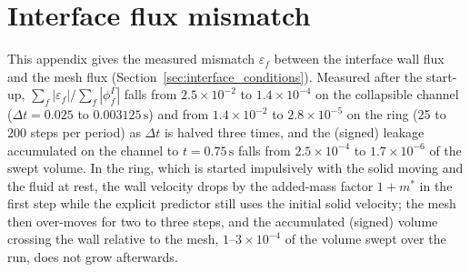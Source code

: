 \section{Interface flux mismatch}\label{app:interface_flux}

This appendix gives the measured mismatch $\varepsilon_f$ between the interface wall flux and the mesh flux (Section~\ref{sec:interface_conditions}).
Measured after the start-up, $\sum_f|\varepsilon_f|/\sum_f|\phi^\Gamma_f|$ falls from $2.5\times10^{-2}$ to $1.4\times10^{-4}$ on the collapsible channel ($\Delta t = 0.025$ to $0.003125\,\mathrm{s}$) and from $1.4\times10^{-2}$ to $2.8\times10^{-5}$ on the ring (25 to 200 steps per period) as $\Delta t$ is halved three times, and the (signed) leakage accumulated on the channel to $t = 0.75\,\mathrm{s}$ falls from $2.5\times10^{-4}$ to $1.7\times10^{-6}$ of the swept volume.
In the ring, which is started impulsively with the solid moving and the fluid at rest, the wall velocity drops by the added-mass factor $1+m^{*}$ in the first step while the explicit predictor still uses the initial solid velocity; the mesh then over-moves for two to three steps, and the accumulated (signed) volume crossing the wall relative to the mesh, $1$--$3\times10^{-4}$ of the volume swept over the run, does not grow afterwards.
